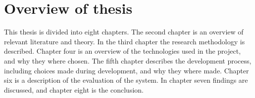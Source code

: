 \documentclass[../Main/thesis.tex]{subfiles}
\begin{document}
\section{Overview of thesis}
This thesis is divided into eight chapters.
The second chapter is an overview of relevant literature and theory.
In the third chapter the research methodology is described.
Chapter four is an overview of the technologies used in the project, and why they where chosen.
The fifth chapter describes the development process, including choices made during development, and why they where made. 
Chapter six is a description of the evaluation of the system.
In chapter seven findings are discussed, and chapter eight is the conclusion.

\onlyinsubfile{}
\onlyinsubfile{}
\end{document}
